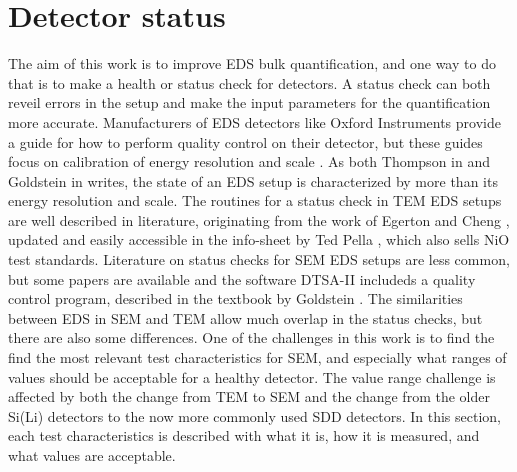 

\clearpage

\section{Detector status}
\label{theory:qc}


The aim of this work is to improve EDS bulk quantification, and one way to do that is to make a health or status check for detectors.
A status check can both reveil errors in the setup and make the input parameters for the quantification more accurate.
Manufacturers of EDS detectors like Oxford Instruments provide a guide for how to perform quality control on their detector, but these guides focus on calibration of energy resolution and scale \cite{aztec_manual}.
As both Thompson in \cite{keith_energy_res_2013} and Goldstein in \cite{goldstein_scanning_2018} writes, the state of an EDS setup is characterized by more than its energy resolution and scale.
The routines for a status check in TEM EDS setups are well described in literature, originating from the work of Egerton and Cheng \cite{egerton_eds_1994}, updated and easily accessible in the info-sheet by Ted Pella \cite{ted_pella_nio_tem_2019}, which also sells NiO test standards.
Literature on status checks for SEM EDS setups are less common, but some papers are available and the software DTSA-II \cite{software_dtsaii} includeds a quality control program, described in the textbook by Goldstein \cite{goldstein_scanning_2018}.
The similarities between EDS in SEM and TEM allow much overlap in the status checks, but there are also some differences.
One of the challenges in this work is to find the find the most relevant test characteristics for SEM, and especially what ranges of values should be acceptable for a healthy detector.
The value range challenge is affected by both the change from TEM to SEM and the change from the older Si(Li) detectors to the now more commonly used SDD detectors.
In this section, each test characteristics is described with what it is, how it is measured, and what values are acceptable.




